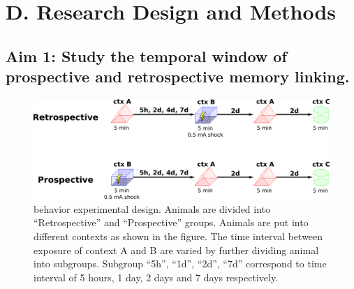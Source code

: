 \documentclass[master.tex]{subfiles}
\begin{document}
\section*{D. Research Design and Methods}

\subsection*{Aim 1: Study the temporal window of prospective and retrospective
  memory linking.}

\begin{figure}[!hbt]
  \centering \includegraphics[scale = .135]{Figures/exp_pro_retro.pdf}
  \caption{\footnotesize behavior experimental design. Animals are divided into
    ``Retrospective'' and ``Prospective'' groups. Animals are put into different
    contexts as shown in the figure. The time interval between exposure of
    context A and B are varied by further dividing animal into subgroups.
    Subgroup ``5h'', ``1d'', ``2d'', ``7d'' correspond to time interval of 5
    hours, 1 day, 2 days and 7 days respectively.}
  \label{fig:exp_behav}
\end{figure}
\end{document}
